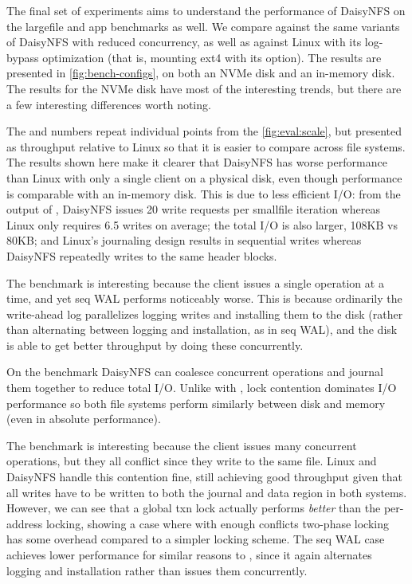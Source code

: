 The final set of experiments aims to understand the performance of DaisyNFS on
the largefile and app benchmarks as well. We compare against the same variants
of DaisyNFS with reduced concurrency, as well as against Linux with its
log-bypass optimization (that is, mounting ext4 with its  option).
The results are presented in \cref{fig:bench-configs},
on both an NVMe disk and an in-memory disk. The results for the NVMe disk have
most of the interesting trends, but there are a few interesting differences
worth noting.

The  and  numbers repeat individual points from
the \cref{fig:eval:scale}, but presented as throughput relative to Linux so that
it is easier to compare across file systems. The  results shown
here make it clearer that DaisyNFS has worse performance than Linux with
only a single client on a physical disk, even though performance is comparable
with an in-memory disk. This is due to less efficient I/O: from the output
of , DaisyNFS issues 20 write requests per smallfile iteration
whereas Linux only requires 6.5 writes on average; the total I/O is also larger,
108KB vs 80KB; and Linux's journaling design results in sequential writes
whereas DaisyNFS repeatedly writes to the same header blocks.

The  benchmark is interesting because the client issues a single
operation at a time, and yet seq WAL performs noticeably worse. This is because ordinarily
the write-ahead log parallelizes logging writes and installing them to the
disk (rather than alternating between logging and installation, as in seq WAL), and the disk is
able to get better throughput by doing these concurrently.

On the  benchmark DaisyNFS can coalesce concurrent operations
and journal them together to reduce total I/O. Unlike with ,
lock contention dominates I/O performance so both file systems perform similarly
between disk and memory (even in absolute performance).

The  benchmark is interesting because the client issues many
concurrent operations, but they all conflict since they write to the same file.
Linux and DaisyNFS handle this contention fine, still achieving good throughput
given that all writes have to be written to both the journal and data region in
both systems. However, we can see that a global txn lock actually performs
\emph{better} than the per-address locking, showing a case where with enough
conflicts two-phase locking has some overhead compared to a simpler locking
scheme. The seq WAL case achieves lower performance for similar reasons to
, since it again alternates logging and installation rather than
issues them concurrently.

